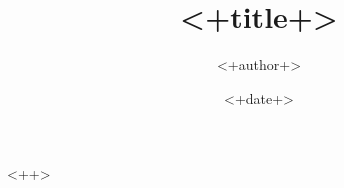 \documentclass[a4paper,fontset = windows]{ctexart}
\begin{document}
\title{<+title+>}
\author{<+author+>}
\date{<+date+>}
\maketitle
\tableofcontents

<++>
\end{document}
